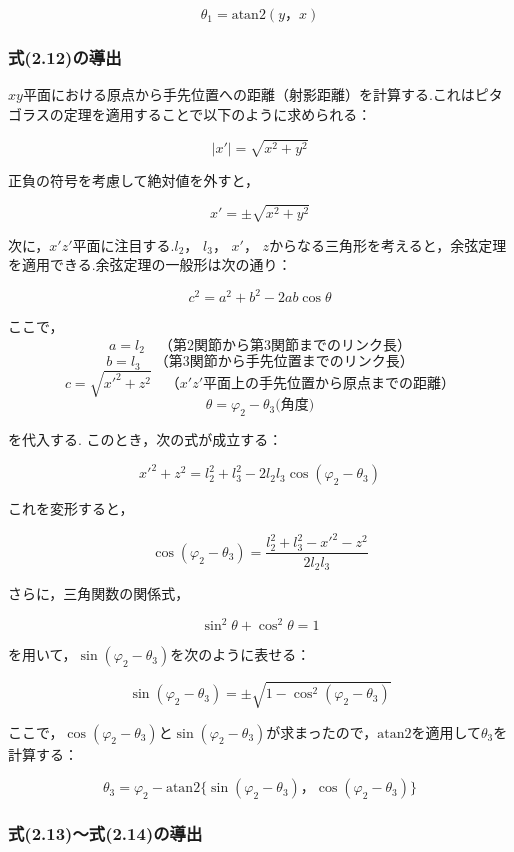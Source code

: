 \[
  \theta_1 = \text{atan2}(y， x) \tag{2.6}
\]

\subsubsection{式(2.12)の導出}

$xy$平面における原点から手先位置への距離（射影距離）を計算する.これはピタゴラスの定理を適用することで以下のように求められる：

\[
  |x'| = \sqrt{x^2 + y^2} \tag{2.7}
\]

正負の符号を考慮して絶対値を外すと，

\[
  x' = \pm \sqrt{x^2 + y^2} \tag{2.8}
\]

次に，$x'z'$平面に注目する.$l_2$， $l_3$， $x'$， $z$からなる三角形を考えると，余弦定理を適用できる.余弦定理の一般形は次の通り：

\[
  c^2 = a^2 + b^2 - 2ab \cos \theta \tag{2.9}
\]

ここで，
\[
  a = l_2 \quad \text{（第2関節から第3関節までのリンク長）}
\]
\[
  b = l_3 \quad \text{（第3関節から手先位置までのリンク長）}
\]
\[
  c = \sqrt{x'^2 + z^2} \quad \text{（$x'z'$平面上の手先位置から原点までの距離）}
\]
\[
  \theta = \varphi_2 - \theta_3 \text{(角度)}
\]

を代入する.
このとき，次の式が成立する：

\[
  x'^2 + z^2 = l_2^2 + l_3^2 - 2l_2 l_3 \cos (\varphi_2 - \theta_3)
\]

これを変形すると，

\[
  \cos(\varphi_2 - \theta_3) = \frac{l_2^2 + l_3^2 - x'^2 - z^2}{2 l_2 l_3} \tag{2.10}
\]

さらに，三角関数の関係式，

\[
  \sin^2 \theta + \cos^2 \theta = 1
\]

を用いて，$\sin(\varphi_2 - \theta_3)$を次のように表せる：

\[
  \sin(\varphi_2 - \theta_3) = \pm \sqrt{1 - \cos^2 (\varphi_2 - \theta_3)} \tag{2.11}
\]

ここで，$\cos(\varphi_2 - \theta_3)$と$\sin(\varphi_2 - \theta_3)$が求まったので，$\text{atan2}$を適用して$\theta_3$を計算する：

\[
  \theta_3 = \varphi_2 - \text{atan2} \{ \sin(\varphi_2 - \theta_3)， \cos(\varphi_2 - \theta_3) \} \tag{2.12}
\]

\subsubsection{式(2.13)～式(2.14)の導出}

